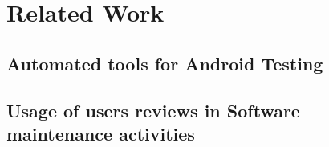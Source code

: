 \documentclass{seal_thesis}
\begin{document}
\chapter{Related Work}
\section{Automated tools for Android Testing}
\label{sec:related_1}

\section{Usage of users reviews in Software maintenance activities}
\label{sec:related_2}



\backmatter


\end{document}
